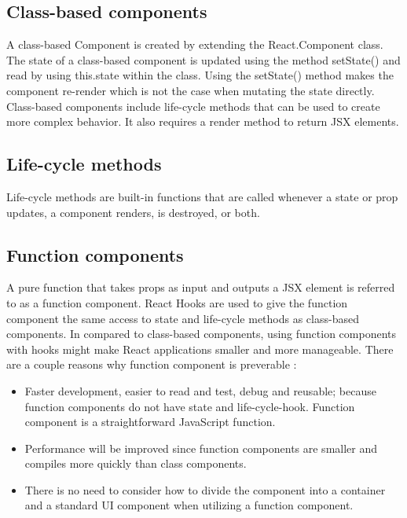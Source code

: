 \subsection{Class-based components}
A class-based Component is created by extending the React.Component class. The state of a class-based component is updated using the method setState() and read by using this.state within the class. Using the setState() method makes the component re-render which is not the case when mutating the state directly. Class-based components include life-cycle methods that can be used to create more complex behavior. It also requires a render method to return JSX elements.

\subsection{Life-cycle methods}
Life-cycle methods are built-in functions that are called whenever a state or prop updates, a component renders, is destroyed, or both.

\subsection{Function components}
A pure function that takes props as input and outputs a JSX element is referred to as a function component. React Hooks are used to give the function component the same access to state and life-cycle methods as class-based components. In compared to class-based components, using function components with hooks might make React applications smaller and more manageable. There are a couple reasons why function component is preverable \autocite{phan2020react}:

\begin{itemize}
  \item Faster development, easier to read and test, debug and reusable; because function components do not have state and life-cycle-hook. Function component is a straightforward JavaScript function.
  \item Performance will be improved since function components are smaller and compiles more quickly than class components.
  \item There is no need to consider how to divide the component into a container and a standard UI component when utilizing a function component.
\end{itemize}

